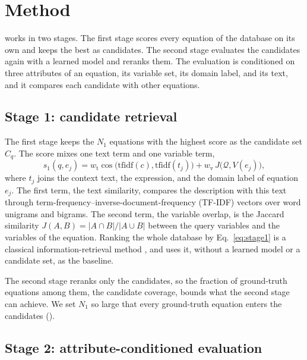 \section{Method}\label{sec:method}

\ours{} works in two stages. The first stage scores every equation of the database on its own
and keeps the best as candidates. The second stage evaluates the candidates again with a learned
model and reranks them. The evaluation is conditioned on three attributes of an equation, its
variable set, its domain label, and its text, and it compares each candidate with other equations.

\subsection{Stage 1: candidate retrieval}\label{sec:stage1}

The first stage keeps the $N_1$ equations with the highest score as the candidate set $C_q$. The
score mixes one text term and one variable term,
\begin{equation}
  s_1(q, e_j) = w_{\mathrm{t}} \cos\!\big(\mathrm{tfidf}(c), \mathrm{tfidf}(t_j)\big)
              + w_{\mathrm{v}} \, J\!\big(\mathcal{Q}, V(e_j)\big) ,
  \label{eq:stage1}
\end{equation}
where $t_j$ joins the context text, the expression, and the domain label of equation $e_j$. The
first term, the text similarity, compares the description with this text through
term-frequency--inverse-document-frequency (TF-IDF) vectors \citep{Salton} over word unigrams and
bigrams. The second term, the variable overlap, is the Jaccard similarity
$J(A, B) = |A \cap B| / |A \cup B|$ between the query variables and the variables of the equation.
Ranking the whole database by Eq.~\eqref{eq:stage1} is a classical information-retrieval method
\citep{Manning}, and  uses it, without a learned model or a candidate set,
as the baseline.

The second stage reranks only the candidates, so the fraction of ground-truth equations among them,
the candidate coverage, bounds what the second stage can achieve. We set $N_1$ so large that every
ground-truth equation enters the candidates ().

\subsection{Stage 2: attribute-conditioned evaluation}\label{sec:stage2}

